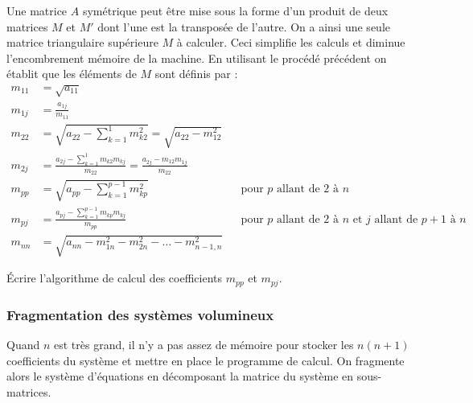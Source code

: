 Une matrice $A$ symétrique peut être mise sous la forme d'un produit de deux
matrices $M$ et $M'$ dont l'une est la transposée de l'autre. On a ainsi une
seule matrice triangulaire supérieure $M$ à calculer. Ceci simplifie les
calculs et diminue l'encombrement mémoire de la machine. En utilisant le
procédé précédent on établit que les éléments de $M$ sont définis par :
\[
\begin{aligned}
  m_{11} &= \sqrt{a_{11}}\\
  m_{1j} &= \frac{a_{1j}}{m_{11}}\\
  m_{22} &= \sqrt{a_{22} - \sum_{k=1}^{1} m_{k2}^2} = \sqrt{a_{22} - m_{12}^2}\\
  m_{2j} &= \frac{a_{2j} - \sum_{k=1}^{1} m_{k2}m_{kj}}{m_{22}}
          = \frac{a_{2j} - m_{12}m_{1j}}{m_{22}}\\
  m_{pp} &= \sqrt{a_{pp} - \sum_{k=1}^{p-1} m_{kp}^2}
          && \text{pour } p \text{ allant de } 2 \text{ à } n\\
  m_{pj} &= \frac{a_{pj} - \sum_{k=1}^{p-1} m_{kp}m_{kj}}{m_{pp}}
          && \text{pour } p \text{ allant de } 2 \text{ à } n
             \text{ et } j \text{ allant de } p+1 \text{ à } n\\
  m_{nn} &= \sqrt{a_{nn} - m_{1n}^2 - m_{2n}^2 - \dots - m_{n-1,n}^2}
\end{aligned}
\]

\begin{exercice}
Écrire l'algorithme de calcul des coefficients $m_{pp}$ et $m_{pj}$.
\end{exercice}

\subsubsection{Fragmentation des systèmes volumineux}

Quand $n$ est très grand, il n'y a pas assez de mémoire pour stocker les
$n(n+1)$ coefficients du système et mettre en place le programme de calcul. On
fragmente alors le système d'équations en décomposant la matrice du système en
sous-matrices.

